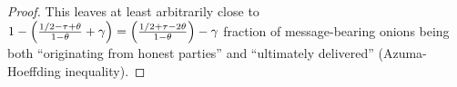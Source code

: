 \documentclass[runningheads,a4paper]{llncs}
\begin{document}
\begin{proof}
This leaves at least arbitrarily close to
$
1 - \left(\frac{1/2 - \tau + \theta}{1-\theta} + \gamma\right) = \left( \frac{1/2 + \tau - 2\theta}{1-\theta}\right) - \gamma$ 
fraction of message-bearing onions being both ``originating from honest parties'' and ``ultimately delivered'' (Azuma-Hoeffding inequality). 
\end{proof}

\end{document}
